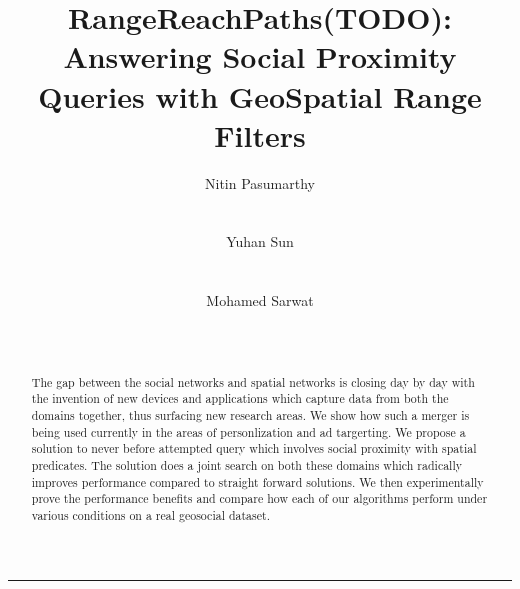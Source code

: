 \documentclass{sig-alternate-05-2015}
\begin{document}
\title{\LARGE \bf RangeReachPaths(TODO): Answering Social Proximity Queries with GeoSpatial Range Filters}

\author{
\alignauthor
Nitin Pasumarthy\\
       \\
       \\
\alignauthor
Yuhan Sun\\
       \\
       \\
\alignauthor
Mohamed Sarwat\\
       \\
       \\
}

\maketitle
\begin{abstract}
The gap between the social networks and spatial networks is closing day by day with the invention of new devices and applications which capture data from both the domains together, thus surfacing new research areas. We show how such a merger is being used currently in the areas of personlization and ad targerting. We propose a solution to never before attempted query which involves social proximity with spatial predicates. The solution does a joint search on both these domains which radically improves performance compared to straight forward solutions. We then experimentally prove the performance benefits and compare how each of our algorithms perform under various conditions on a real geosocial dataset.
\end{abstract}

\printccsdesc




















\begin{center}\rule{0.5\linewidth}{\linethickness}\end{center}
\end{document}
